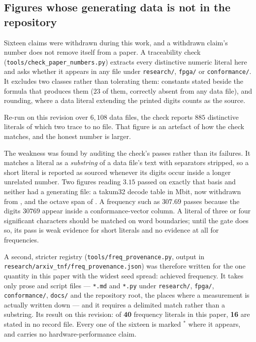 \subsection{Figures whose generating data is not in the repository}
\label{sec:provenance}

Sixteen claims were withdrawn during this work, and a withdrawn claim's number
does not remove itself from a paper. A traceability check
(\texttt{tools/\allowbreak check\_\allowbreak paper\_\allowbreak numbers.py}) extracts every distinctive numeric
literal here and asks whether it appears in any file under \texttt{research/},
\texttt{fpga/} or \texttt{conformance/}. It excludes two classes rather than
tolerating them: constants stated beside the formula that produces them ($23$ of
them, correctly absent from any data file), and rounding, where a data literal
extending the printed digits counts as the source.

Re-run on this revision over $6{,}108$ data files, the check reports $885$
distinctive literals of which two trace to no file. That figure is an artefact of
how the check matches, and the honest number is larger.

The weakness was found by auditing the check's passes rather than its failures. It
matches a literal as a \emph{substring} of a data file's text with separators
stripped, so a short literal is reported as sourced whenever its digits occur
inside a longer unrelated number. Two figures reading $3.15$ passed on exactly that
basis and neither had a generating file: a takum32 decode table in Mbit, now
withdrawn from , and the octave span of
. A frequency such as $307.69$ passes because the
digits $30769$ appear inside a conformance-vector column. A literal of three or
four significant characters should be matched on word boundaries; until the gate
does so, its pass is weak evidence for short literals and no evidence at all for
frequencies.

A second, stricter registry (\texttt{tools/}\allowbreak\texttt{freq\_provenance.py},
output in \texttt{research/}\allowbreak\texttt{arxiv\_tnf/}\allowbreak\texttt{freq\_provenance.json}) was therefore written for the
one quantity in this paper with the widest seed spread: achieved frequency. It
takes only prose and script files --- \texttt{*.md} and \texttt{*.py} under
\texttt{research/}, \texttt{fpga/}, \texttt{conformance/}, \texttt{docs/} and the
repository root, the places where a measurement is actually written down --- and it
requires a delimited match rather than a substring. Its result on this revision:
of \textbf{40} frequency literals in this paper, \textbf{16} are stated in no
record file. Every one of the sixteen is marked $^{\ast}$ where it appears, and
carries no hardware-performance claim.


